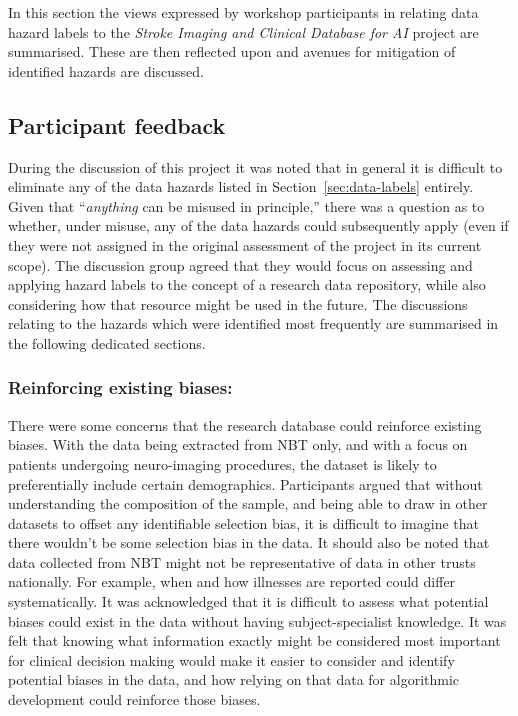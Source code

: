 \documentclass{article}
\begin{document}
In this section the views expressed by workshop participants in
relating data hazard labels to the \textit{Stroke Imaging and Clinical
  Database for AI} project are summarised. These are then reflected
upon and avenues for mitigation of identified hazards are discussed.


\subsection{Participant feedback}

During the discussion of this project it was noted that in general it
is difficult to eliminate any of the data hazards listed in
Section~\ref{sec:data-labels} entirely. Given that ``\textit{anything}
can be misused in principle,'' there was a question as to whether,
under misuse, any of the data hazards could subsequently apply (even
if they were not assigned in the original assessment of the project in
its current scope).
The discussion group agreed that they would focus on assessing and
applying hazard labels to the concept of a research data repository,
while also considering how that resource might be used in the
future. The discussions relating to the hazards which were identified
most frequently are summarised in the following dedicated sections. 

\subsubsection{Reinforcing existing biases:}
There were some concerns that the research database could reinforce
existing biases. With the data being
extracted from NBT only, and with a focus on patients undergoing
neuro-imaging procedures, the dataset is likely to preferentially
include certain demographics. Participants argued that without understanding the composition of
the sample, and being able to draw in other datasets to offset
any identifiable selection bias, it is difficult to imagine that there
wouldn't be some selection bias in the data. It should also be noted
that data collected from NBT might not be representative of data in
other trusts nationally. For example, when and how
illnesses are reported could differ systematically.
It was acknowledged that it is difficult to assess what potential
biases could exist in the data without having subject-specialist
knowledge. It was felt that knowing what information
exactly might be considered most important for clinical decision
making would make it easier to consider and identify potential biases
in the data, and how relying on that data for algorithmic development
could reinforce those biases. \\ 
\end{document}
